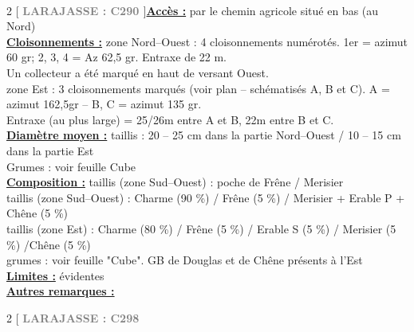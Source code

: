 \documentclass[a4paper,openany]{book}\usepackage[]{graphicx}\usepackage[]{color}
\begin{document}
\\\begin{multicols}{2}
[
\textbf{\textcolor{gray}{
\large LARAJASSE : C290
}}
]\noindent\textbf{\underline{Accès :}} par le chemin agricole situé en bas (au Nord)\vspace{0.1cm} \\\noindent\textbf{\underline{Cloisonnements :}} zone Nord--Ouest : 4 cloisonnements numérotés. 1er = azimut 60 gr; 2, 3, 4 = Az 62,5 gr. Entraxe de 22 m.\\
Un collecteur a été marqué en haut de versant Ouest.\\
zone Est : 3 cloisonnements marqués (voir plan -- schématisés A, B et C). A = azimut 162,5gr -- B, C = azimut 135 gr.\\
Entraxe (au plus large) = 25/26m entre A et B, 22m entre B et C.\vspace{0.1cm} \\\noindent\textbf{\underline{Diamètre moyen :}} taillis : 20 -- 25 cm dans la partie Nord--Ouest / 10 -- 15 cm dans la partie Est \\ Grumes : voir feuille Cube\vspace{0.1cm} \\\noindent\textbf{\underline{Composition :}} taillis (zone Sud--Ouest) : poche de Frêne / Merisier \\
taillis (zone Sud--Ouest) : Charme (90 \%) / Frêne (5 \%) / Merisier + Erable P + Chêne (5 \%) \\
taillis (zone Est) : Charme (80 \%) / Frêne (5 \%) / Erable S (5 \%) / Merisier (5 \%) /Chêne (5 \%) \\
grumes : voir feuille "Cube". GB de Douglas et de Chêne présents à l'Est\vspace{0.1cm} \\\noindent\textbf{\underline{Limites :}} évidentes\vspace{0.1cm} \\\noindent\textbf{\underline{Autres remarques :}} \vspace{0.1cm} \\\end{multicols}\begin{multicols}{2}
[
\textbf{\textcolor{gray}{
\large LARAJASSE : C298
}}

\end{multicols}
\end{document}
